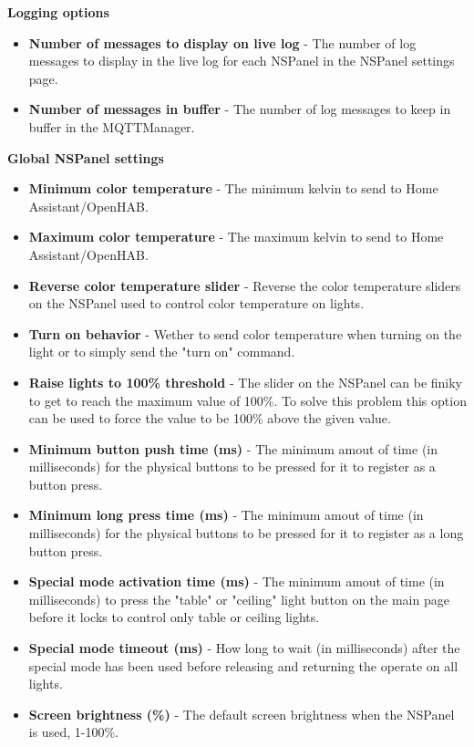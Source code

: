 \documentclass[10pt]{article}
\begin{document}
    \textbf{Logging options}
    \begin{itemize}
      \item \textbf{Number of messages to display on live log} - The number of log messages to display in the live log for each NSPanel in the NSPanel settings page.
      \item \textbf{Number of messages in buffer} - The number of log messages to keep in buffer in the MQTTManager.
    \end{itemize}

    \textbf{Global NSPanel settings}
    \begin{itemize}
      \item \textbf{Minimum color temperature} - The minimum kelvin to send to Home Assistant/OpenHAB.
      \item \textbf{Maximum color temperature} - The maximum kelvin to send to Home Assistant/OpenHAB.
      \item \textbf{Reverse color temperature slider} - Reverse the color temperature sliders on the NSPanel used to control color temperature on lights.
      \item \textbf{Turn on behavior} - Wether to send color temperature when turning on the light or to simply send the "turn on" command.
      \item \textbf{Raise lights to 100\% threshold} - The slider on the NSPanel can be finiky to get to reach the maximum value of 100\%. To solve this problem this option can be used to force the value to be 100\% above the given value.
      \item \textbf{Minimum button push time (ms)} - The minimum amout of time (in milliseconds) for the physical buttons to be pressed for it to register as a button press.
      \item \textbf{Minimum long press time (ms)} - The minimum amout of time (in milliseconds) for the physical buttons to be pressed for it to register as a long button press.
      \item \textbf{Special mode activation time (ms)} - The minimum amout of time (in milliseconds) to press the "table" or "ceiling" light button on the main page before it locks to control only table or ceiling lights.
      \item \textbf{Special mode timeout (ms)} - How long to wait (in milliseconds) after the special mode has been used before releasing and returning the operate on all lights.
      \item \textbf{Screen brightness (\%)} - The default screen brightness when the NSPanel is used, 1-100\%.

\end{itemize}
\end{document}
